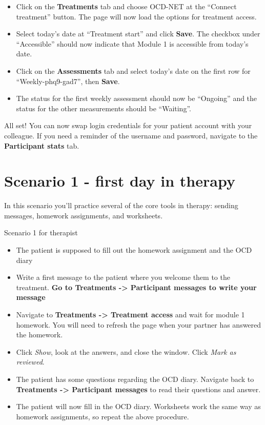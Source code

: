 \documentclass[]{book}
\providecommand{\tightlist}{%
  \setlength{\itemsep}{0pt}\setlength{\parskip}{0pt}}
\begin{document}
\begin{itemize}
\tightlist
\item
  Click on the \textbf{Treatments} tab and choose OCD-NET at the ``Connect treatment'' button. The page will now load the options for treatment access.
\item
  Select today's date at ``Treatment start'' and click \textbf{Save}. The checkbox under ``Accessible'' should now indicate that Module 1 is accessible from today's date.
\item
  Click on the \textbf{Assessments} tab and select today's date on the first row for ``Weekly-phq9-gad7'', then \textbf{Save}.
\item
  The status for the first weekly assessment should now be ``Ongoing'' and the status for the other measurements should be ``Waiting''.
\end{itemize}

All set! You can now swap login credentials for your patient account with your colleague. If you need a reminder of the username and password, navigate to the \textbf{Participant stats} tab.

\hypertarget{scenario-1---first-day-in-therapy}{%
\section{Scenario 1 - first day in therapy}\label{scenario-1---first-day-in-therapy}}

In this scenario you'll practice several of the core tools in therapy: sending messages, homework assignments, and worksheets.

Scenario 1 for therapist

\begin{itemize}
\tightlist
\item
  The patient is supposed to fill out the homework assignment and the OCD diary
\item
  Write a first message to the patient where you welcome them to the treatment. \textbf{Go to Treatments -\textgreater{} Participant messages to write your message}
\item
  Navigate to \textbf{Treatments -\textgreater{} Treatment access} and wait for module 1 homework. You will need to refresh the page when your partner has answered the homework.
\item
  Click \emph{Show}, look at the answers, and close the window. Click \emph{Mark as reviewed}.
\item
  The patient has some questions regarding the OCD diary. Navigate back to \textbf{Treatments -\textgreater{} Participant messages} to read their questions and answer.
\item
  The patient will now fill in the OCD diary. Worksheets work the same way as homework assignments, so repeat the above procedure.
\end{itemize}
\end{document}
